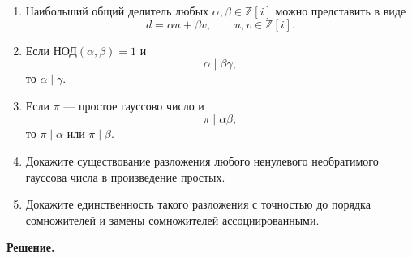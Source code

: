 
\begin{enumerate}[label=\textbf{\alph*)}, leftmargin=8mm]
    \item Наибольший общий делитель любых $\alpha,\beta\in\mathbb Z[i]$
    можно представить в виде
    \[
        d=\alpha u+\beta v,
        \qquad u,v\in\mathbb Z[i].
    \]

    \item Если $\text{НОД}(\alpha,\beta)=1$ и
    \[
        \alpha\mid\beta\gamma,
    \]
    то $\alpha\mid\gamma$.

    \item Если $\pi$ — простое гауссово число и
    \[
        \pi\mid\alpha\beta,
    \]
    то $\pi\mid\alpha$ или $\pi\mid\beta$.

    \item Докажите существование разложения любого ненулевого
    необратимого гауссова числа в произведение простых.

    \item Докажите единственность такого разложения с точностью до
    порядка сомножителей и замены сомножителей ассоциированными.
\end{enumerate}

\smallskip
\textbf{Решение.}

